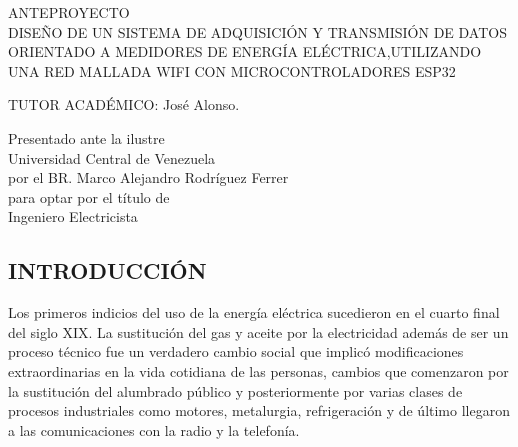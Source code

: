 \documentclass[12pt,letterpaper]{article}
\author{} %
\date{31 de julio de 2019} %
\begin{document}
	
	\renewcommand{\listfigurename}{Lista de Figuras}
	\renewcommand{\listtablename}{Lista de Tablas}
	\renewcommand{\contentsname}{Lista de Contenidos}
	\renewcommand{\figurename}{Figura}
	\renewcommand{\tablename}{Tabla}

	
\begin{center}

\vspace{3cm} ANTEPROYECTO \\

\vspace{8cm} DISEÑO DE UN SISTEMA DE ADQUISICIÓN Y TRANSMISIÓN DE DATOS ORIENTADO A MEDIDORES DE ENERGÍA ELÉCTRICA,UTILIZANDO UNA RED MALLADA WIFI CON MICROCONTROLADORES ESP32
\end{center}


\vspace{6cm}

\begin{flushleft}
	TUTOR ACADÉMICO: José Alonso. \\
	
\end{flushleft}

	
\begin{flushright}
	
	
		Presentado ante la ilustre\\
		Universidad Central de Venezuela\\
		por el BR. Marco Alejandro Rodríguez Ferrer \\
		para optar por el título de \\
		Ingeniero Electricista   \\
	


\end{flushright}


\vspace{2cm}
\thispagestyle{empty}
\newpage


\begin{center}
	\section*{ INTRODUCCIÓN}
\end{center}

Los primeros indicios del uso de la energía eléctrica sucedieron en el cuarto final del siglo XIX. La sustitución del gas y aceite por la electricidad además de ser un proceso técnico fue un verdadero cambio social que implicó modificaciones extraordinarias en la vida cotidiana de las personas, cambios que comenzaron por la sustitución del alumbrado público y posteriormente por varias clases de procesos industriales como motores, metalurgia, refrigeración y de último llegaron a las comunicaciones con la radio y la telefonía.\\
\end{document}
